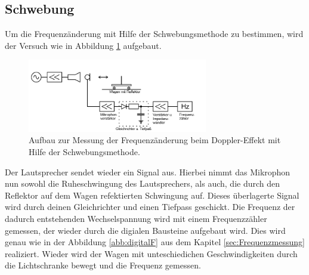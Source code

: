 \subsection{Schwebung}
\label{sec:Schwebung}
Um die Frequenzänderung mit Hilfe der Schwebungsmethode
zu bestimmen, wird der Versuch wie in Abbildung \ref{abb:Schwebung}
aufgebaut.
\begin{figure}
\centering
\includegraphics[width=0.7\textwidth]{Schwebung.PNG}
\caption{Aufbau zur Messung der Frequenzänderung beim Doppler-Effekt mit Hilfe der Schwebungsmethode.\cite{skript}}
\label{abb:Schwebung}
\end{figure}
Der Lautsprecher sendet wieder ein Signal aus.
Hierbei nimmt das Mikrophon nun sowohl die
Ruheschwingung des Lautsprechers, als
auch, die durch den Reflektor auf dem
Wagen refektierten Schwingung auf.
Dieses überlagerte Signal wird durch deinen Gleichrichter
und einen Tiefpass geschickt. Die Frequenz der dadurch
entstehenden Wechselspannung wird mit einem Frequenzzähler
gemessen, der wieder durch die digialen Bausteine
aufgebaut wird. Dies wird genau wie in der Abbildung
 \ref{abb:digitalF} aus dem Kapitel \ref{sec:Frequenzmessung} realiziert.
Wieder wird der Wagen mit unteschiedichen Geschwindigkeiten
durch die Lichtschranke bewegt und die Frequenz gemessen.
